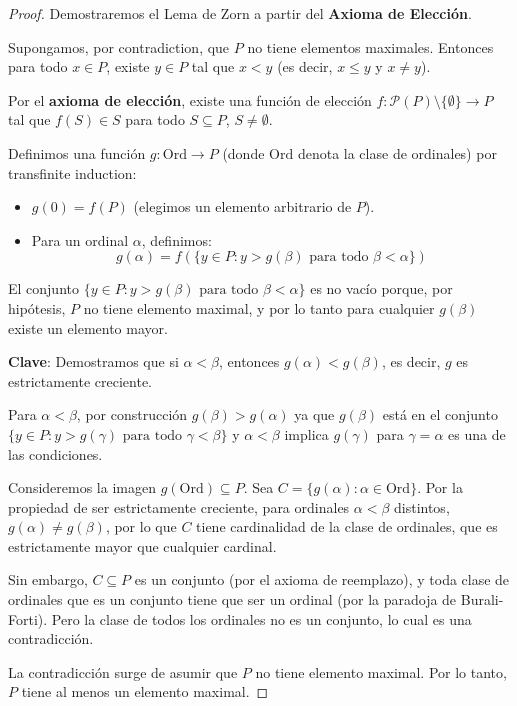 \documentclass[11pt,a4paper]{article}
\theoremstyle{plain}
\theoremstyle{definition}
\begin{document}
\begin{proof}
Demostraremos el Lema de Zorn a partir del \textbf{Axioma de Elección}.

Supongamos, por contradiction, que $P$ no tiene elementos maximales. Entonces para todo $x \in P$, existe $y \in P$ tal que $x < y$ (es decir, $x \leq y$ y $x \neq y$).

Por el \textbf{axioma de elección}, existe una función de elección $f: \mathcal{P}(P) \setminus \{\emptyset\} \to P$ tal que $f(S) \in S$ para todo $S \subseteq P$, $S \neq \emptyset$.

Definimos una función $g: \mathrm{Ord} \to P$ (donde $\mathrm{Ord}$ denota la clase de ordinales) por transfinite induction:
\begin{itemize}
    \item $g(0) = f(P)$ (elegimos un elemento arbitrario de $P$).
    \item Para un ordinal $\alpha$, definimos:
    \[
    g(\alpha) = f\left(\{y \in P : y > g(\beta) \text{ para todo } \beta < \alpha\}\right)
    \]
\end{itemize}

El conjunto $\{y \in P : y > g(\beta) \text{ para todo } \beta < \alpha\}$ es no vacío porque, por hipótesis, $P$ no tiene elemento maximal, y por lo tanto para cualquier $g(\beta)$ existe un elemento mayor.

\textbf{Clave}: Demostramos que si $\alpha < \beta$, entonces $g(\alpha) < g(\beta)$, es decir, $g$ es estrictamente creciente.

Para $\alpha < \beta$, por construcción $g(\beta) > g(\alpha)$ ya que $g(\beta)$ está en el conjunto $\{y \in P : y > g(\gamma) \text{ para todo } \gamma < \beta\}$ y $\alpha < \beta$ implica $g(\gamma)$ para $\gamma = \alpha$ es una de las condiciones.

Consideremos la imagen $g(\mathrm{Ord}) \subseteq P$. Sea $C = \{g(\alpha) : \alpha \in \mathrm{Ord}\}$. Por la propiedad de ser estrictamente creciente, para ordinales $\alpha < \beta$ distintos, $g(\alpha) \neq g(\beta)$, por lo que $C$ tiene cardinalidad de la clase de ordinales, que es estrictamente mayor que cualquier cardinal.

Sin embargo, $C \subseteq P$ es un conjunto (por el axioma de reemplazo), y toda clase de ordinales que es un conjunto tiene que ser un ordinal (por la paradoja de Burali-Forti). Pero la clase de todos los ordinales no es un conjunto, lo cual es una contradicción.

La contradicción surge de asumir que $P$ no tiene elemento maximal. Por lo tanto, $P$ tiene al menos un elemento maximal.
\end{proof}
\end{document}
